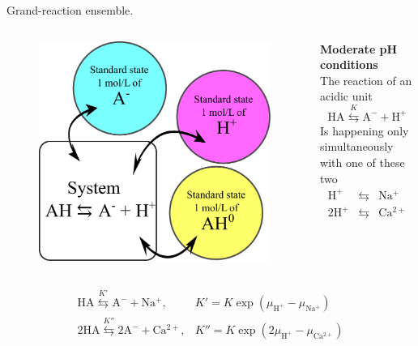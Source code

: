 \documentclass[10pt]{beamer}
\newcommand{\na}{\mathrm{Na^+}}
\newcommand{\h}{\mathrm{H^+}}
\newcommand{\ca}{\mathrm{Ca^{2+}}}
\begin{document}
\begin{frame}{Grand-reaction ensemble.}

	\begin{columns}[T,onlytextwidth]%
			\begin{figure}
				\includegraphics[height=4.cm]{figures/standard_states.pdf}
			\end{figure} 
			\textbf{Moderate pH conditions}\\ 
			\vspace{1cm}
			The reaction of an acidic unit 
			\begin{equation*}
				\mathrm{HA}\stackrel{K}{\leftrightarrows}\mathrm{A^-}+\mathrm{H^+}\label{eq: acid reaction}
			\end{equation*}
	Is happening only simultaneously with one of these two
	\begin{eqnarray*}
		\h&\leftrightarrows&\na \label{eq:hna} \\
		2\h&\leftrightarrows&\ca \label{eq:hca}
	\end{eqnarray*}

	\end{columns} %
\begin{eqnarray*}
\mathrm{HA}\stackrel{K'}{\leftrightarrows}\mathrm{A}^{-}+\na, &K' = K \exp(\mu_\h-\mu_\na) \\
2\mathrm{HA}\stackrel{K''}{\leftrightarrows}2\mathrm{A}^{-}+\ca, &K'' = K \exp(2\mu_\h-\mu_\ca)
\end{eqnarray*}
\end{frame}
\end{document}
